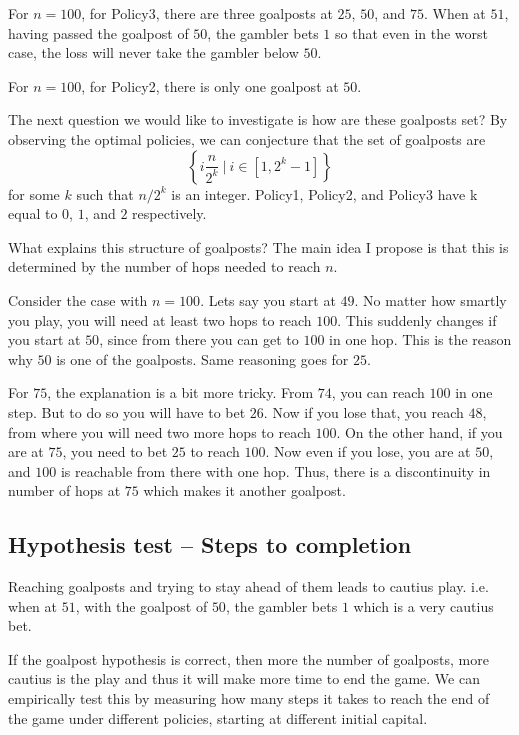 \documentclass{article}
\begin{document}
For $n = 100$, for Policy3, there are three goalposts at $25$, $50$, and $75$. When at $51$, having passed the goalpost of $50$, the gambler bets $1$ so that even in the worst case, the loss will never take the gambler below $50$.

For $n = 100$, for Policy2, there is only one goalpost at $50$.

The next question we would like to investigate is how are these goalposts set? By observing the optimal policies, we can conjecture that the set of goalposts are $$\left\lbrace i\frac{n}{2^k} \ | \ i \in [1, 2^k-1] \right\rbrace$$ for some $k$ such that $n/2^k$ is an integer. Policy1, Policy2, and Policy3 have k equal to $0$, $1$, and $2$ respectively. 

What explains this structure of goalposts? The main idea I propose is that this is determined by the number of hops needed to reach $n$.

Consider the case with $n=100$. Lets say you start at $49$. No matter how smartly you play, you will need at least two hops to reach $100$. This suddenly changes if you start at $50$, since from there you can get to $100$ in one hop. This is the reason why $50$ is one of the goalposts. Same reasoning goes for $25$.

For $75$, the explanation is a bit more tricky. From $74$, you can reach $100$ in one step. But to do so you will have to bet $26$. Now if you lose that, you reach $48$, from where you will need two more hops to reach $100$. On the other hand, if you are at $75$, you need to bet $25$ to reach $100$. Now even if you lose, you are at $50$, and $100$ is reachable from there with one hop. Thus, there is a discontinuity in number of hops at $75$ which makes it another goalpost.

\subsection{Hypothesis test -- Steps to completion}

Reaching goalposts and trying to stay ahead of them leads to cautius play. i.e. when at $51$, with the goalpost of $50$, the gambler bets $1$ which is a very cautius bet.

If the goalpost hypothesis is correct, then more the number of goalposts, more cautius is the play and thus it will make more time to end the game. We can empirically test this by measuring how many steps it takes to reach the end of the game under different policies, starting at different initial capital.
\end{document}
